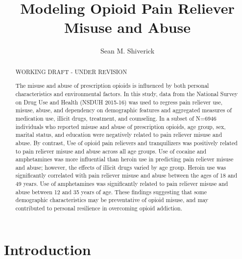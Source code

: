 \documentclass[sigconf]{acmart}
\begin{document}
\title{Modeling Opioid Pain Reliever Misuse and Abuse}
  
  \author{Sean M. Shiverick}

\renewcommand{\shortauthors}{S.M. Shiverick}


\begin{abstract}
WORKING DRAFT - UNDER REVISION

The misuse and abuse of prescription opioids is influenced by both personal 
characteristics and environmental factors. In this study, data from the 
National Survey on Drug Use and Health (NSDUH 2015-16) was used to regress 
pain reliever use, misuse, abuse, and dependency on demographic features and
aggregated measures of medication use, illicit drugs, treatment, and counseling.  
In a subset of N=6946 individuals who reported misuse and abuse of prescription 
opioids, age group, sex, marital status, and education were negatively related
to pain reliever misuse and abuse. By contrast, Use of opioid pain relievers and 
tranquilizers was positively related to pain reliever misuse and abuse across 
all age groups. Use of cocaine and amphetamines was more influential than 
heroin use in predicting pain reliever misuse and abuse; however, the effects 
of illicit drugs varied by age group. Heroin use was significantly correlated
with pain reliever misuse and abuse between the ages of 18 and 49 years. Use of 
amphetamines was significantly related to pain reliever misuse and abuse 
between 12 and 35 years of age. These findings suggesting that some demographic 
characteristics may be preventative of opioid misuse, and may contributed to 
personal resilience in overcoming opioid addiction.
\end{abstract}


\maketitle

\section{Introduction}
\end{document}
